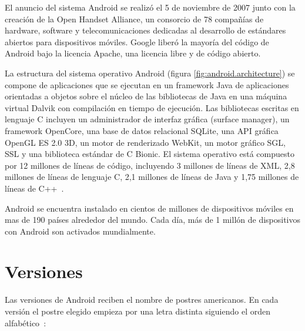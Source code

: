 El anuncio del sistema Android se realiz\'o el 5 de noviembre de 2007 junto con la creaci\'on de la Open Handset Alliance, un consorcio de 78 compañ\'ias de hardware, software y telecomunicaciones dedicadas al desarrollo de est\'andares abiertos para dispositivos m\'oviles. Google liber\'o la mayor\'ia del c\'odigo de Android\Si{\texttrademark} bajo la licencia Apache, una licencia libre y de c\'odigo abierto.

La estructura del sistema operativo Android\Si{\texttrademark} (figura \ref{fig:android.architecture}) se compone de aplicaciones que se ejecutan en un framework Java de aplicaciones orientadas a objetos sobre el n\'ucleo de las bibliotecas de Java en una m\'aquina virtual Dalvik con compilaci\'on en tiempo de ejecuci\'on. Las bibliotecas escritas en lenguaje C incluyen un administrador de interfaz gr\'afica (surface manager), un framework OpenCore, una base de datos relacional SQLite, una \ac{API} gr\'afica OpenGL ES 2.0 3D, un motor de renderizado WebKit, un motor gr\'afico SGL, SSL y una biblioteca est\'andar de C Bionic. El sistema operativo est\'a compuesto por 12 millones de l\'ineas de c\'odigo, incluyendo 3 millones de l\'ineas de XML, 2,8 millones de l\'ineas de lenguaje C, 2,1 millones de l\'ineas de Java y 1,75 millones de l\'ineas de C++~\cite{wiki.android}.


Android se encuentra instalado en cientos de millones de dispositivos m\'oviles en mas de 190 pa\'ises alrededor del mundo. Cada d\'ia, m\'as de 1 mill\'on de dispositivos con Android son activados mundialmente.

\section{Versiones}
\label{sec:android.versions.1}

Las versiones de Android reciben el nombre de postres americanos. En cada versión el postre elegido empieza por una letra distinta siguiendo el orden alfab\'etico~\cite{and.dev.versions}:

